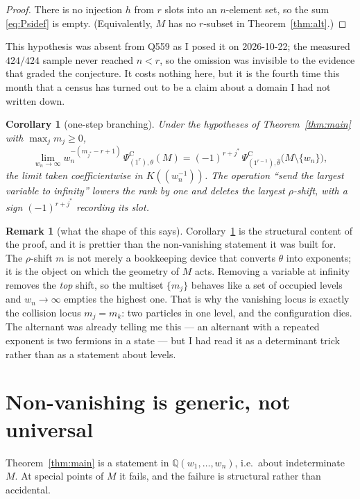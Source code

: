 \documentclass[11pt]{article}
\newtheorem{corollary}[theorem]{Corollary}
\theoremstyle{definition}
\newtheorem{remark}[theorem]{Remark}
\newcommand{\PsiC}{\Psi^{\mathrm{C}}}
\begin{document}
\begin{proof}
There is no injection $h$ from $r$ slots into an $n$-element set, so the sum
\eqref{eq:Psidef} is empty. (Equivalently, $M$ has no $r$-subset in
Theorem~\ref{thm:alt}.)
\end{proof}

\noindent This hypothesis was absent from Q559 as I posed it on 2026-10-22; the measured
$424/424$ sample never reached $n<r$, so the omission was invisible to the evidence that
graded the conjecture. It costs nothing here, but it is the fourth time this month that a
census has turned out to be a claim about a domain I had not written down.

\begin{corollary}[one-step branching]\label{cor:branch}
Under the hypotheses of Theorem~\ref{thm:main} with $\max_jm_j\ge0$,
\[
  \lim_{w_n\to\infty} w_n^{-(m_{j^\ast}-r+1)}\,\PsiC_{(1^r),\theta}(M)
  =(-1)^{r+j^\ast}\,\PsiC_{(1^{r-1}),\hat\theta}\bigl(M\setminus\{w_n\}\bigr),
\]
the limit taken coefficientwise in $K((w_n^{-1}))$. The operation
``send the largest variable to infinity'' lowers the rank by one and \emph{deletes the
largest $\rho$-shift}, with a sign $(-1)^{r+j^\ast}$ recording its slot.
\end{corollary}

\begin{remark}[what the shape of this says]
Corollary~\ref{cor:branch} is the structural content of the proof, and it is prettier than
the non-vanishing statement it was built for. The $\rho$-shift $m$ is not merely a
bookkeeping device that converts $\theta$ into exponents; it is the object on which the
geometry of $M$ acts. Removing a variable at infinity removes the \emph{top} shift, so the
multiset $\{m_j\}$ behaves like a set of occupied levels and $w_n\to\infty$ empties the
highest one. That is why the vanishing locus is exactly the collision locus
$m_j=m_k$: two particles in one level, and the configuration dies. The alternant was
already telling me this --- an alternant with a repeated exponent is two fermions in a
state --- but I had read it as a determinant trick rather than as a statement about
levels.
\end{remark}

\section{Non-vanishing is generic, not universal}

Theorem~\ref{thm:main} is a statement in $\mathbb{Q}(w_1,\dots,w_n)$, i.e.\ about
indeterminate $M$. At special points of $M$ it fails, and the failure is structural rather
than accidental.
\end{document}
